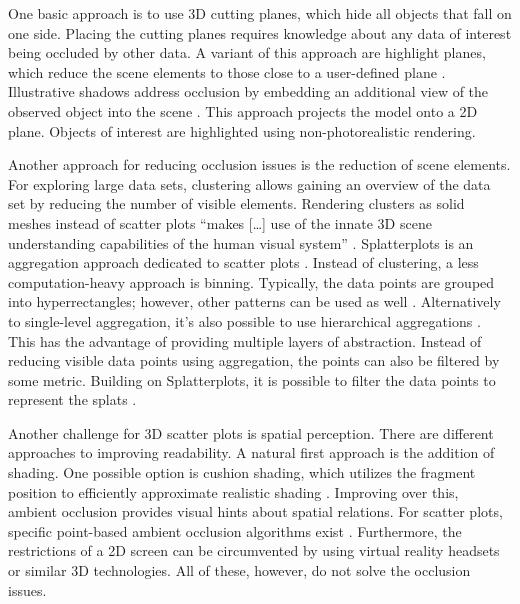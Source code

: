 \documentclass[sigconf]{acmart}
\begin{document}
One basic approach is to use 3D cutting planes, which hide all objects that fall on one side.
Placing the cutting planes requires knowledge about any data of interest being occluded by other data.
A variant of this approach are highlight planes, which reduce the scene elements to those close to a user-defined plane \cite{highlightPlane}.
Illustrative shadows address occlusion by embedding an additional view of the observed object into the scene \cite{illustrativeShadows}.
This approach projects the model onto a 2D plane.
Objects of interest are highlighted using non-photorealistic rendering.

Another approach for reducing occlusion issues is the reduction of scene elements.
For exploring large data sets, clustering allows gaining an overview of the data set by reducing the number of visible elements.
Rendering clusters as solid meshes instead of scatter plots \enquote{makes [\ldots] use of the innate 3D scene understanding capabilities of the human visual system} \cite{subspaceShapes}.
Splatterplots is an aggregation approach dedicated to scatter plots \cite{splatterplots}.
Instead of clustering, a less computation-heavy approach is binning.
Typically, the data points are grouped into hyperrectangles; however, other patterns can be used as well \cite{binning}.
Alternatively to single-level aggregation, it's also possible to use hierarchical aggregations \cite{hierarchAggr}.
This has the advantage of providing multiple layers of abstraction.
Instead of reducing visible data points using aggregation, the points can also be filtered by some metric.
Building on Splatterplots, it is possible to filter the data points to represent the splats \cite{spSmartFilter}.

Another challenge for 3D scatter plots is spatial perception.
There are different approaches to improving readability.
A natural first approach is the addition of shading.
One possible option is cushion shading, which utilizes the fragment position to efficiently approximate realistic shading \cite{cushionShading}.
Improving over this, ambient occlusion provides visual hints about spatial relations.
For scatter plots, specific point-based ambient occlusion algorithms exist \cite{pointAO}.
Furthermore, the restrictions of a 2D screen can be circumvented by using virtual reality headsets or similar 3D technologies.
All of these, however, do not solve the occlusion issues.
\end{document}
